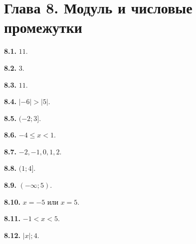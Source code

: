 \documentclass[12pt,a4paper,oneside,openany]{book}
\theoremstyle{colordef}\newtheorem{definition}{Определение}[chapter]
\theoremstyle{plain}\newtheorem{theorem}{Теорема}[chapter]
\theoremstyle{definition}\newtheorem{axiom}{Аксиома}[chapter]
\begin{document}
\section*{Глава 8. Модуль и числовые промежутки}
\begingroup\setlength{\parskip}{3pt}
\textbf{8.1.} \(11\).\par
\textbf{8.2.} \(3\).\par
\textbf{8.3.} \(11\).\par
\textbf{8.4.} \(| - 6 | > | 5 |\).\par
\textbf{8.5.} \((- 2;\allowbreak 3]\).\par
\textbf{8.6.} \(- 4 \le  x < 1\).\par
\textbf{8.7.} \(- 2,\allowbreak - 1,\allowbreak 0,\allowbreak 1,\allowbreak 2\).\par
\textbf{8.8.} \((1;\allowbreak 4]\).\par
\textbf{8.9.} \((- \infty ;\allowbreak 5)\).\par
\textbf{8.10.} \(x = - 5\) или \(x = 5\).\par
\textbf{8.11.} \(- 1 < x < 5\).\par
\textbf{8.12.} \(| x |;\allowbreak 4\).\par
\end{document}
